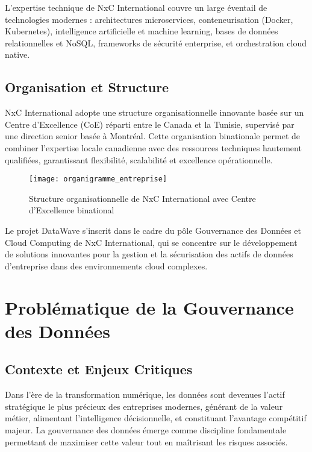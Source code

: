 L'expertise technique de NxC International couvre un large éventail de technologies modernes : architectures microservices, conteneurisation (Docker, Kubernetes), intelligence artificielle et machine learning, bases de données relationnelles et NoSQL, frameworks de sécurité enterprise, et orchestration cloud native.

\subsection{Organisation et Structure}

NxC International adopte une structure organisationnelle innovante basée sur un Centre d'Excellence (CoE) réparti entre le Canada et la Tunisie, supervisé par une direction senior basée à Montréal. Cette organisation binationale permet de combiner l'expertise locale canadienne avec des ressources techniques hautement qualifiées, garantissant flexibilité, scalabilité et excellence opérationnelle.

\begin{figure}[htpb]
\centering
\texttt{[image: organigramme\_entreprise]}
\caption{Structure organisationnelle de NxC International avec Centre d'Excellence binational}
\label{fig:organigramme}
\end{figure}

Le projet DataWave s'inscrit dans le cadre du pôle Gouvernance des Données et Cloud Computing de NxC International, qui se concentre sur le développement de solutions innovantes pour la gestion et la sécurisation des actifs de données d'entreprise dans des environnements cloud complexes.

\section{Problématique de la Gouvernance des Données}

\subsection{Contexte et Enjeux Critiques}

Dans l'ère de la transformation numérique, les données sont devenues l'actif stratégique le plus précieux des entreprises modernes, générant de la valeur métier, alimentant l'intelligence décisionnelle, et constituant l'avantage compétitif majeur. La gouvernance des données émerge comme discipline fondamentale permettant de maximiser cette valeur tout en maîtrisant les risques associés.

